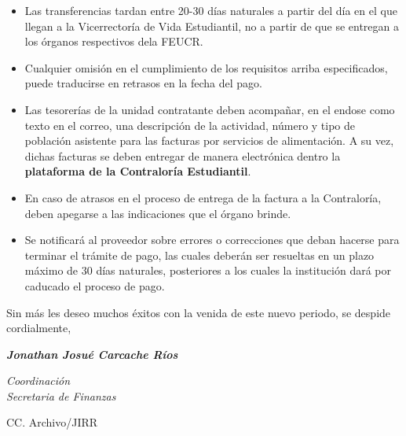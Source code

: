 \documentclass[12pt]{article}
\begin{document}
\begin{itemize}
    \item Las transferencias tardan entre 20-30 días naturales a partir del día en el que llegan a la
    Vicerrectoría de Vida Estudiantil, no a partir de que se entregan a los órganos respectivos dela FEUCR.
    \item Cualquier omisión en el cumplimiento de los requisitos arriba especificados, puede traducirse
en retrasos en la fecha del pago.
    \item Las tesorerías de la unidad contratante deben acompañar, en el endose como texto en el correo, una descripción de la actividad, número y tipo de población asistente para las facturas por servicios de alimentación. A su vez, dichas facturas se deben entregar de manera electrónica dentro la \textbf{plataforma de la Contraloría Estudiantil}.
    \item En caso de atrasos en el proceso de entrega de la factura a la Contraloría, deben apegarse a las indicaciones que el órgano brinde. 
    \item Se notificará al proveedor sobre errores o correcciones que deban hacerse para terminar el trámite de pago, las cuales deberán ser resueltas en un plazo máximo de 30 días naturales, posteriores a los cuales la institución dará por caducado el proceso de pago.
\end{itemize}

Sin más les deseo muchos éxitos con la venida de este nuevo periodo, se despide cordialmente,\par
\bigskip
\bigskip
\bigskip
\begin{spacing}{1}
\textit{\textbf{Jonathan Josué Carcache Ríos}}\par
\textit{Coordinación}\\
\textit{Secretaria de Finanzas}
\end{spacing}
\medskip
\begin{flushleft}\begin{spacing}{1}
 \scriptsize{CC. Archivo/JIRR

 }
\end{spacing}\end{flushleft}
%
%
\end{document}
